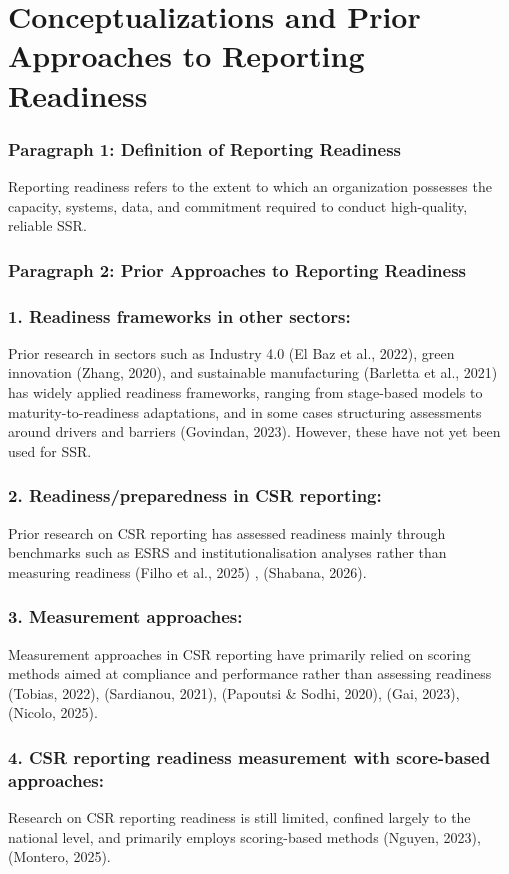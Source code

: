 \section{Conceptualizations and Prior Approaches to Reporting Readiness}
\subsubsection{Paragraph 1: Definition of Reporting Readiness}
Reporting readiness refers to the extent to which an organization possesses the capacity, systems, data,
and commitment required to conduct high-quality, reliable SSR.

\subsubsection{Paragraph 2: Prior Approaches to Reporting Readiness}

\subsubsection{1. Readiness frameworks in other sectors:}
Prior research in sectors such as Industry 4.0 (El Baz et al., 2022), green innovation (Zhang, 2020),
and sustainable manufacturing (Barletta et al., 2021) has widely applied readiness frameworks,
ranging from stage-based models to maturity-to-readiness adaptations, 
and in some cases structuring assessments around drivers and barriers (Govindan, 2023).
However, these have not yet been used for SSR.

\subsubsection{2. Readiness/preparedness in CSR reporting:}
Prior research on CSR reporting has assessed readiness mainly through benchmarks 
such as ESRS and institutionalisation analyses rather than measuring readiness 
(Filho et al., 2025) , (Shabana, 2026).

\subsubsection{3. Measurement approaches:}
Measurement approaches in CSR reporting have primarily relied on scoring methods
aimed at compliance and performance rather than assessing readiness
(Tobias, 2022), (Sardianou, 2021), (Papoutsi \& Sodhi, 2020), (Gai, 2023), (Nicolo, 2025).

\subsubsection{4. CSR reporting readiness measurement with score-based approaches:}
Research on CSR reporting readiness is still limited, confined largely to the national level, 
and primarily employs scoring-based methods
(Nguyen, 2023), (Montero, 2025).

